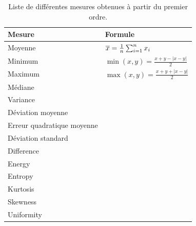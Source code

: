 \begin{table}[H]
    \centering
    \begin{tabular}{ll}
        \hline
        \textbf{Mesure}             & \textbf{Formule}                                                  \\ \hline
        Moyenne                     & $\overline{x} = {1 \over n} \sum_{i=1}^n{x_i}$                    \\     
        Minimum                     & $\min{(x,y)}=\frac{x+y-|x-y|}2$                                   \\    
        Maximum                     & $\max{(x,y)}=\frac{x+y+|x-y|}2$                                   \\  
        Médiane                     & \\      
        Variance                    & \\ 
        Déviation moyenne           & \\
        Erreur quadratique moyenne  & \\ 
        Déviation standard          & \\ 
        Difference                  & \\
        Energy                      & \\
        Entropy                     & \\
        Kurtosis                    & \\
        Skewness                    & \\      
        Uniformity                  & \\  
    \end{tabular}
    \caption{Liste de différentes mesures obtenues à partir du premier ordre.}
    \label{tab:first_order_descriptors}
\end{table}\par


